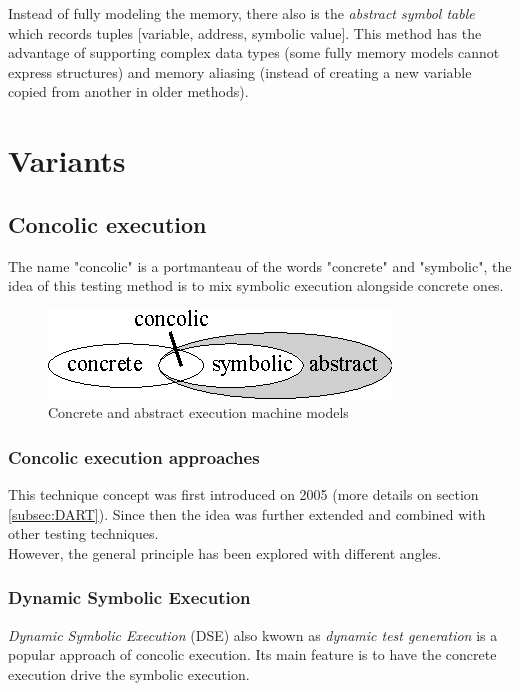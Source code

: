 \documentclass[11pt]{article}
\begin{document}
        Instead of fully modeling the memory, there also is the \emph{abstract symbol table}~\cite{memorytablemodel} which records tuples [variable, address, symbolic value]. This method has the advantage of supporting complex data types (some fully memory models cannot express structures) and memory aliasing (instead of creating a new variable copied from another in older methods).
  \section{Variants}
    \subsection{Concolic execution}
    \label{subsec:concolicExecution}
    	The name "concolic" is a portmanteau of the words "concrete" and "symbolic", the idea of this testing method is to mix symbolic execution alongside concrete ones.\\

    	\begin{figure}
    		\centering
    		\includegraphics[width=0.34\columnwidth]{concrete-abstract.eps}
			\caption{Concrete and abstract execution machine models}
			\label{fig:concrete-symbolic}
    	\end{figure}

    	\subsubsection*{Concolic execution approaches}
    		This technique concept was first introduced on 2005 \cite{godefroid2005dart} (more details on section \ref{subsec:DART}). %
    	Since then the idea was further extended and combined with other testing techniques.\\

    	However, the general principle has been explored with different angles.

    		\subsubsection{Dynamic Symbolic Execution}
    		\label{subsec:dynamicSymbolicExec}
    			\emph{Dynamic Symbolic Execution} (DSE) also kwown as \emph{dynamic test generation} \cite{godefroid2005dart} is a popular approach of concolic execution. Its main feature is to have the concrete execution drive the symbolic execution.\\
\end{document}
